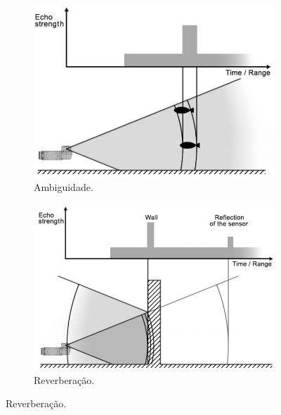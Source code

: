 \begin{figure}[H]
    \centering
    \caption{Problemas que podem ser gerados em imagens acústicas.}
    \label{fig:acoustic_image}
    \begin{subfigure}[t]{0.4\textwidth}
        \includegraphics[width=\textwidth]{dados/figuras/ambiguity.png}
        \caption{Ambiguidade.}
        \label{fig:indertemination}
    \end{subfigure}
    \begin{subfigure}[t]{0.45\textwidth}
        \includegraphics[width=\textwidth]{dados/figuras/reflectance.png}
        \caption{Reverberação.}
        \label{fig:beam_reflected}
    \end{subfigure}
\end{figure}


